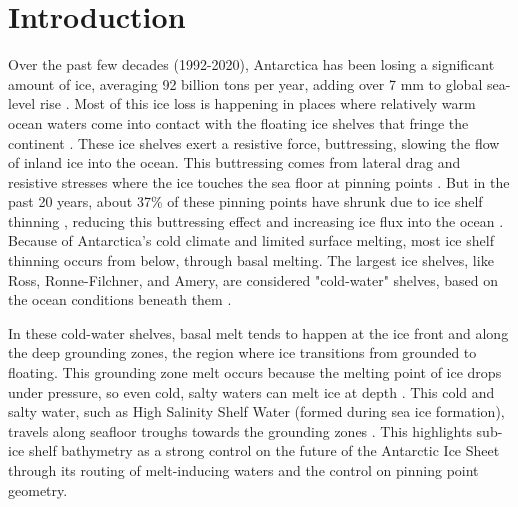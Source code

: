 \documentclass[tc, manuscript]{copernicus}
\begin{document}
\section{Introduction}

Over the past few decades (1992-2020), Antarctica has been losing a significant amount of ice, averaging 92 billion tons per year, adding over 7 mm to global sea-level rise \citep{otosakamass2023}. Most of this ice loss is happening in places where relatively warm ocean waters come into contact with the floating ice shelves that fringe the continent \citep{rignotfour2019}. These ice shelves exert a resistive force, buttressing, slowing the flow of inland ice into the ocean. This buttressing comes from lateral drag and resistive stresses where the ice touches the sea floor at pinning points \citep{dupontassessment2005, matsuokaantarctic2015}. But in the past 20 years, about 37\% of these pinning points have shrunk due to ice shelf thinning \citep{milesprogressive2024}, reducing this buttressing effect and increasing ice flux into the ocean \citep[e.g.][]{pritchardantarctic2012, scambosglacier2004}. Because of Antarctica's cold climate and limited surface melting, most ice shelf thinning occurs from below, through basal melting. The largest ice shelves, like Ross, Ronne-Filchner, and Amery, are considered "cold-water" shelves, based on the ocean conditions beneath them \citep{adusumilliinterannual2020}.

In these cold-water shelves, basal melt tends to happen at the ice front and along the deep grounding zones, the region where ice transitions from grounded to floating. This grounding zone melt occurs because the melting point of ice drops under pressure, so even cold, salty waters can melt ice at depth \citep{alleyoceanic2015}. This cold and salty water, such as High Salinity Shelf Water (formed during sea ice formation), travels along seafloor troughs towards the grounding zones \citep[e.g.][]{tintoross2019}. This highlights sub-ice shelf bathymetry as a strong control on the future of the Antarctic Ice Sheet through its routing of melt-inducing waters and the control on pinning point geometry.
\end{document}
